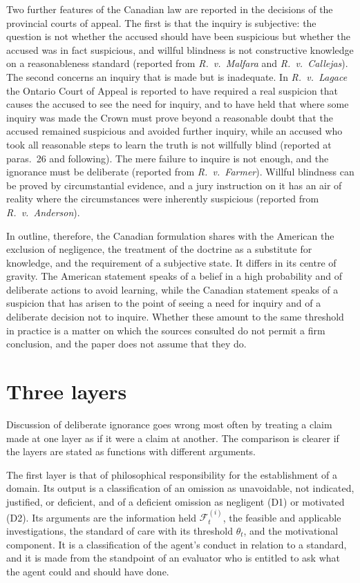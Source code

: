 \documentclass[11pt]{article}
\newcommand{\F}{\mathcal F}
\theoremstyle{plain}
\theoremstyle{definition}
\begin{document}
Two further features of the Canadian law are reported in the decisions of the provincial courts of appeal. The first is that the inquiry is subjective: the question is not whether the accused should have been suspicious but whether the accused was in fact suspicious, and willful blindness is not constructive knowledge on a reasonableness standard (reported from \emph{R.\ v.\ Malfara} and \emph{R.\ v.\ Callejas}). The second concerns an inquiry that is made but is inadequate. In \emph{R.\ v.\ Lagace} the Ontario Court of Appeal is reported to have required a real suspicion that causes the accused to see the need for inquiry, and to have held that where some inquiry was made the Crown must prove beyond a reasonable doubt that the accused remained suspicious and avoided further inquiry, while an accused who took all reasonable steps to learn the truth is not willfully blind (reported at paras.\ 26 and following). The mere failure to inquire is not enough, and the ignorance must be deliberate (reported from \emph{R.\ v.\ Farmer}). Willful blindness can be proved by circumstantial evidence, and a jury instruction on it has an air of reality where the circumstances were inherently suspicious (reported from \emph{R.\ v.\ Anderson}).

In outline, therefore, the Canadian formulation shares with the American the exclusion of negligence, the treatment of the doctrine as a substitute for knowledge, and the requirement of a subjective state. It differs in its centre of gravity. The American statement speaks of a belief in a high probability and of deliberate actions to avoid learning, while the Canadian statement speaks of a suspicion that has arisen to the point of seeing a need for inquiry and of a deliberate decision not to inquire. Whether these amount to the same threshold in practice is a matter on which the sources consulted do not permit a firm conclusion, and the paper does not assume that they do.

\section{Three layers}

Discussion of deliberate ignorance goes wrong most often by treating a claim made at one layer as if it were a claim at another. The comparison is clearer if the layers are stated as functions with different arguments.

The first layer is that of philosophical responsibility for the establishment of a domain. Its output is a classification of an omission as unavoidable, not indicated, justified, or deficient, and of a deficient omission as negligent (D1) or motivated (D2). Its arguments are the information held $\F^{(i)}_t$, the feasible and applicable investigations, the standard of care with its threshold $\theta_t$, and the motivational component. It is a classification of the agent's conduct in relation to a standard, and it is made from the standpoint of an evaluator who is entitled to ask what the agent could and should have done.
\end{document}
